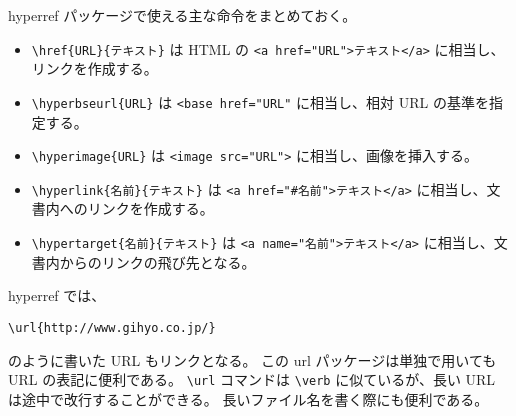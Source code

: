 hyperref パッケージで使える主な命令をまとめておく。
\begin{itemize}\setlength{\leftskip}{-1.00zw}%
\item \verb'\href{URL}{テキスト}' は HTML の \verb|<a href="URL">テキスト</a>| に相当し、リンクを作成する。
\item \verb'\hyperbseurl{URL}' は \verb|<base href="URL"| に相当し、相対 URL の基準を指定する。
\item \verb'\hyperimage{URL}' は \verb|<image src="URL">| に相当し、画像を挿入する。
\item \verb'\hyperlink{名前}{テキスト}' は \verb|<a href="#名前">テキスト</a>| に相当し、文書内へのリンクを作成する。
\item \verb'\hypertarget{名前}{テキスト}' は \verb|<a name="名前">テキスト</a>| に相当し、文書内からのリンクの飛び先となる。
\end{itemize}
hyperref では、
\begin{mdframed}[roundcorner=0.50zw,leftmargin=3.00zw,rightmargin=3.00zw,skipabove=0.40zw,skipbelow=0.40zw,innertopmargin=4.00pt,innerbottommargin=4.00pt,innerleftmargin=5.00pt,innerrightmargin=5.00pt,linecolor=gray!020,linewidth=0.50pt,backgroundcolor=gray!20]
\begin{verbatim}
\url{http://www.gihyo.co.jp/}
\end{verbatim}
\end{mdframed}
のように書いた URL もリンクとなる。
この url パッケージは単独で用いても URL の表記に便利である。
\verb'\url' コマンドは \verb'\verb' に似ているが、長い URL は途中で改行することができる。
長いファイル名を書く際にも便利である。
